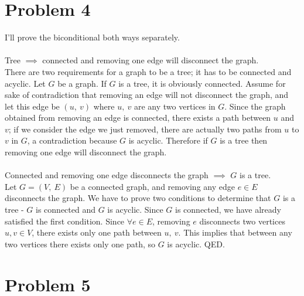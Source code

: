 \documentclass[11pt]{article}
\begin{document}
\section*{Problem 4}
I'll prove the biconditional both ways separately.\\\\
Tree $\implies$ connected and removing one edge will disconnect the graph.\\

There are two requirements for a graph to be a tree; it has to be connected and acyclic. Let $G$ be a graph. If $G$ is a tree, it is obviously connected. Assume for sake of contradiction that removing an edge will not disconnect the graph, and let this edge be $(u,\ v)$ where $u,\ v$ are any two vertices in $G$. Since the graph obtained from removing an edge is connected, there exists a path between $u$ and $v$; if we consider the edge we just removed, there are actually two paths from $u$ to $v$ in $G$, a contradiction because $G$ is acyclic. Therefore if $G$ is a tree then removing one edge will disconnect the graph.\\\\
Connected and removing one edge disconnects the graph $\implies$ $G$ is a tree.\\

Let $G= (V,\ E)$ be a connected graph, and removing any edge $e \in E$ disconnects the graph. We have to prove two conditions to determine that $G$ is a tree - $G$ is connected and $G$ is acyclic. Since $G$ is connected, we have already satisfied the first condition. Since $\forall e \in E$, removing $e$ disconnects two vertices $u, v \in V$, there exists only one path between $u,\ v$. This implies that between any two vertices there exists only one path, so $G$ is acyclic. QED.


\section*{Problem 5}
\end{document}
